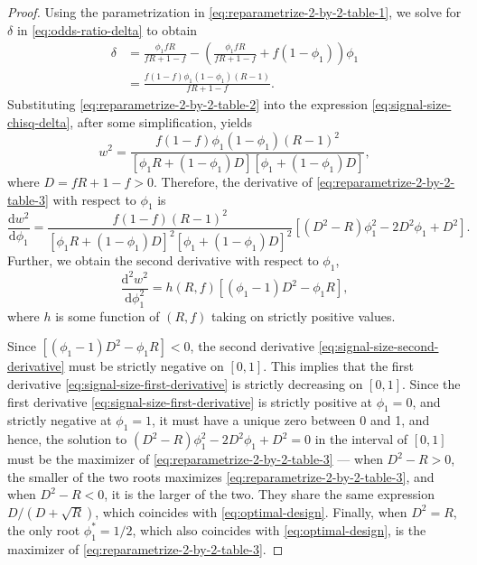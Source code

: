 \begin{proof}
	Using the parametrization in \eqref{eq:reparametrize-2-by-2-table-1}, we solve for $\delta$ in \eqref{eq:odds-ratio-delta} to obtain
	\begin{align}
		\delta &= \frac{\phi_1 fR}{fR+1-f} - \left(\frac{\phi_1 fR}{fR+1-f} + f(1-\phi_1)\right)\phi_1 \nonumber \\
		&= \frac{f(1-f)\phi_1(1-\phi_1)(R-1)}{fR+1-f}. \label{eq:reparametrize-2-by-2-table-2}
	\end{align}
	Substituting \eqref{eq:reparametrize-2-by-2-table-2} into the expression \eqref{eq:signal-size-chisq-delta}, after some simplification, yields
	\begin{equation} \label{eq:reparametrize-2-by-2-table-3}
	w^2 = \frac{f(1-f)\phi_1(1-\phi_1)(R-1)^2}{\left[\phi_1 R + (1-\phi_1)D\right]\left[\phi_1 + (1-\phi_1)D\right]},
	\end{equation}
	where $D = fR+1-f > 0$.
	Therefore, the derivative of \eqref{eq:reparametrize-2-by-2-table-3} with respect to $\phi_1$ is
	\begin{equation} \label{eq:signal-size-first-derivative}
	\frac{\mathrm{d}w^2}{\mathrm{d}\phi_1} = 
	\frac{f(1-f)(R-1)^2}{\left[\phi_1 R+(1-\phi_1)D\right]^2 \left[\phi_1+(1-\phi_1)D\right]^2} \left[(D^2-R)\phi_1^2 - 2D^2\phi_1 + D^2\right].
	\end{equation}
	Further, we obtain the second derivative with respect to $\phi_1$,
	\begin{equation} \label{eq:signal-size-second-derivative}
	\frac{\mathrm{d}^2w^2}{\mathrm{d}\phi_1^2} = 
	h(R,f) \left[(\phi_1-1)D^2 - \phi_1R\right],
	\end{equation}
	where $h$ is some function of $(R,f)$ taking on strictly positive values.
	
	Since $\left[(\phi_1-1)D^2 - \phi_1R\right]<0$, the second derivative \eqref{eq:signal-size-second-derivative} must be strictly negative on $[0,1]$.
	This implies that the first derivative \eqref{eq:signal-size-first-derivative} is strictly decreasing on $[0,1]$. 
	Since the first derivative \eqref{eq:signal-size-first-derivative} is strictly positive at $\phi_1=0$, and strictly negative at $\phi_1=1$, it must have a unique zero between 0 and 1, and hence, the solution to $(D^2-R)\phi_1^2 - 2D^2\phi_1 + D^2 = 0$ in the interval of $[0,1]$ must be the maximizer of \eqref{eq:reparametrize-2-by-2-table-3} --- when $D^2-R>0$, the smaller of the two roots maximizes \eqref{eq:reparametrize-2-by-2-table-3}, and when $D^2-R<0$, it is the larger of the two.
	They share the same expression ${D}/{(D+\sqrt{R})}$, which coincides with \eqref{eq:optimal-design}.
	Finally, when $D^2=R$, the only root $\phi_1^*=1/2$, which also coincides with \eqref{eq:optimal-design}, is the maximizer 
	of \eqref{eq:reparametrize-2-by-2-table-3}.  
\end{proof}

